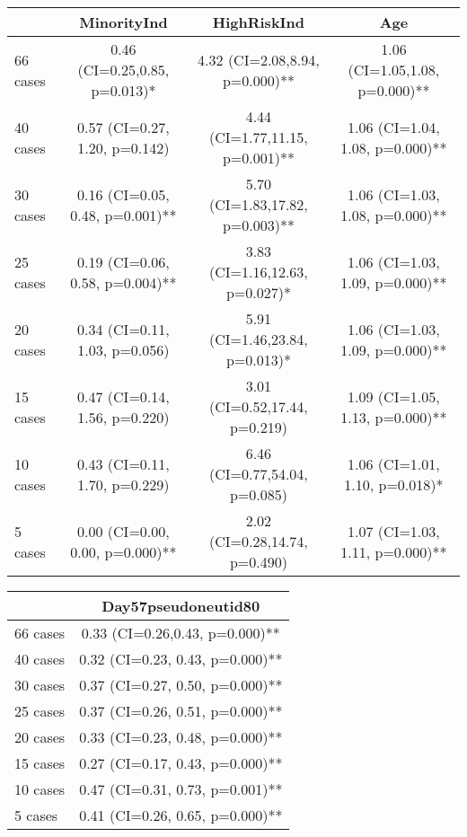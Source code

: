 \vspace{20pt}

\begin{tabular}{lccc}
   \hline  &MinorityInd& HighRiskInd& Age\\ 
\hline
66 cases & 0.46 (CI=0.25,0.85, p=0.013)* & 4.32 (CI=2.08,8.94, p=0.000)** & 1.06 (CI=1.05,1.08, p=0.000)** \\ 
  40 cases & 0.57 (CI=0.27, 1.20, p=0.142) & 4.44 (CI=1.77,11.15, p=0.001)** & 1.06 (CI=1.04, 1.08, p=0.000)** \\ 
  30 cases & 0.16 (CI=0.05, 0.48, p=0.001)** & 5.70 (CI=1.83,17.82, p=0.003)** & 1.06 (CI=1.03, 1.08, p=0.000)** \\ 
  25 cases & 0.19 (CI=0.06, 0.58, p=0.004)** & 3.83 (CI=1.16,12.63, p=0.027)* & 1.06 (CI=1.03, 1.09, p=0.000)** \\ 
  20 cases & 0.34 (CI=0.11, 1.03, p=0.056) & 5.91 (CI=1.46,23.84, p=0.013)* & 1.06 (CI=1.03, 1.09, p=0.000)** \\ 
  15 cases & 0.47 (CI=0.14, 1.56, p=0.220) & 3.01 (CI=0.52,17.44, p=0.219) & 1.09 (CI=1.05, 1.13, p=0.000)** \\ 
  10 cases & 0.43 (CI=0.11, 1.70, p=0.229) & 6.46 (CI=0.77,54.04, p=0.085) & 1.06 (CI=1.01, 1.10, p=0.018)* \\ 
  5 cases & 0.00 (CI=0.00, 0.00, p=0.000)** & 2.02 (CI=0.28,14.74, p=0.490) & 1.07 (CI=1.03, 1.11, p=0.000)** \\ 
   \hline
\end{tabular}
\vspace{20pt}

\begin{tabular}{lc}
   \hline  &Day57pseudoneutid80\\ 
\hline
66 cases & 0.33 (CI=0.26,0.43, p=0.000)** \\ 
  40 cases & 0.32 (CI=0.23, 0.43, p=0.000)** \\ 
  30 cases & 0.37 (CI=0.27, 0.50, p=0.000)** \\ 
  25 cases & 0.37 (CI=0.26, 0.51, p=0.000)** \\ 
  20 cases & 0.33 (CI=0.23, 0.48, p=0.000)** \\ 
  15 cases & 0.27 (CI=0.17, 0.43, p=0.000)** \\ 
  10 cases & 0.47 (CI=0.31, 0.73, p=0.001)** \\ 
  5 cases & 0.41 (CI=0.26, 0.65, p=0.000)** \\ 
   \hline
\end{tabular}
